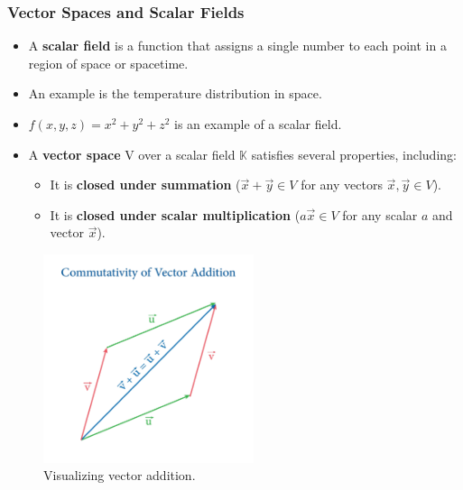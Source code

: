 \documentclass[aspectratio=169,xcolor=dvipsnames,svgnames,x11names,fleqn]{beamer}
\begin{document}
\begin{frame}[allowframebreaks]
\frametitle{Vector Spaces and Scalar Fields}
\begin{itemize}
    \item A \textbf{scalar field} is a function that assigns a single number to each point in a region of space or spacetime.
    \item An example is the temperature distribution in space.
    \item $f(x,y,z)=x^2+y^2+z^2$ is an example of a scalar field.
    \item A \textbf{vector space} V over a scalar field $\mathbb{K}$ satisfies several properties, including:
    \begin{itemize}
        \item It is \textbf{closed under summation} ($\vec{x}+\vec{y} \in V$ for any vectors $\vec{x}, \vec{y} \in V$).
        \item It is \textbf{closed under scalar multiplication} ($a\vec{x} \in V$ for any scalar $a$ and vector $\vec{x}$).
    \end{itemize}
\end{itemize}
\begin{figure}
\centering
\includegraphics[width=0.55\textwidth]{figures/vector_addition.jpeg}
\caption{Visualizing vector addition.}
\end{figure}
\end{frame}
\end{document}
